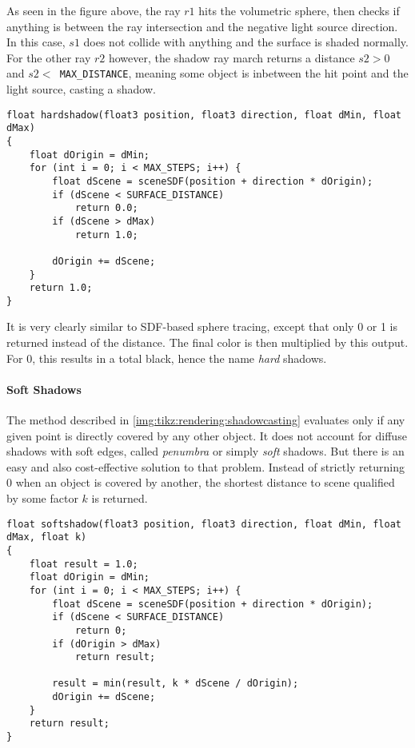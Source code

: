 \noindent
As seen in the figure above, the ray $r1$ hits the volumetric sphere, then checks if anything is between the ray intersection and the negative light source direction.
In this case, $s1$ does not collide with anything and the surface is shaded normally. 
For the other ray $r2$ however, the shadow ray march returns a distance $s2 > 0$ and $s2 < $\lstinline[language=HLSL]{ MAX_DISTANCE}, meaning some object is inbetween the hit point and the light source, casting a shadow.
\\
\begin{lstlisting}[language=HLSL, caption=Implementation of hard shadow casting., label=lst:shader:shadowcasting:hard]
float hardshadow(float3 position, float3 direction, float dMin, float dMax)
{
    float dOrigin = dMin;
    for (int i = 0; i < MAX_STEPS; i++) {
        float dScene = sceneSDF(position + direction * dOrigin);
        if (dScene < SURFACE_DISTANCE)
            return 0.0;
        if (dScene > dMax)
            return 1.0;
        
        dOrigin += dScene;
    }
    return 1.0;
}
\end{lstlisting}

\noindent
It is very clearly similar to SDF-based sphere tracing, except that only 0 or 1 is returned instead of the distance.
The final color is then multiplied by this output. For 0, this results in a total black, hence the name \textit{hard} shadows.

\paragraph{Soft Shadows}
The method described in \autoref{img:tikz:rendering:shadowcasting} evaluates only if any given point is directly covered by any other object. 
It does not account for diffuse shadows with soft edges, called \textit{\gls{penumbra}} or simply \textit{soft} shadows. But there is an easy and also cost-effective solution to that problem.
Instead of strictly returning 0 when an object is covered by another, the shortest distance to scene qualified by some factor $k$ is returned.

\begin{lstlisting}[language=HLSL, caption=Implementation of hard shadow casting., label=lst:shader:shadowcasting:soft]
float softshadow(float3 position, float3 direction, float dMin, float dMax, float k)
{
    float result = 1.0;
    float dOrigin = dMin;
    for (int i = 0; i < MAX_STEPS; i++) {
        float dScene = sceneSDF(position + direction * dOrigin);
        if (dScene < SURFACE_DISTANCE)
            return 0;
        if (dOrigin > dMax)
            return result;
        
        result = min(result, k * dScene / dOrigin);
        dOrigin += dScene;
    }
    return result;
}
\end{lstlisting}


